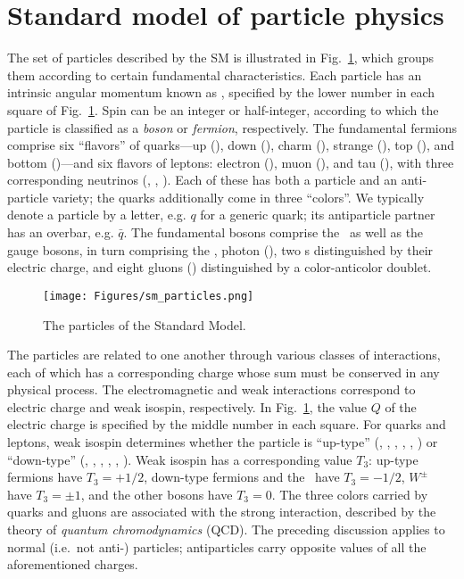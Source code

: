 \section{Standard model of particle physics} \label{sec:introduction_standard_model}
The set of particles described by the SM is illustrated in Fig.~\ref{fig:sm_particles}, which
groups them according to certain fundamental characteristics.
Each particle has an intrinsic angular momentum known as , specified by the lower number in each square of Fig.~\ref{fig:sm_particles}.
Spin can be an integer or half-integer, according to which the particle is classified as a \textit{boson} or \textit{fermion}, respectively.
The fundamental fermions comprise six ``flavors'' of quarks---up (\Pu), down (\Pd), charm (\Pc), strange (\Ps), top (\Pt), and bottom (\Pb)---and six flavors of
leptons: electron (\Pe), muon (\Pmu), and tau (\Ptau), with three corresponding neutrinos (\Pne, \Pnmu, \Pntau).
Each of these has both a particle and an anti-particle variety; the quarks additionally come in three ``colors''.
We typically denote a particle by a letter, e.g. $q$ for a generic quark; its antiparticle partner has an overbar, e.g. $\bar{q}$.
The fundamental bosons comprise the \PH\ as well as the gauge bosons, in turn comprising the \PZ, photon (\Pgamma),
two \PW s distinguished by their electric charge, and eight gluons (\Pg) distinguished by a color-anticolor doublet.

\begin{figure}[hbtp]
  \begin{center}
    \texttt{[image: Figures/sm\_particles.png]}
    \caption{
      The particles of the Standard Model.
    }
    \label{fig:sm_particles}
  \end{center}
\end{figure}

The particles are related to one another through various
classes of interactions, each of which has a corresponding charge whose sum must be conserved in any physical process.
The electromagnetic and weak interactions correspond to electric charge and weak isospin, respectively.
In Fig.~\ref{fig:sm_particles}, the value $Q$ of the electric charge is specified by the middle number in each square.
For quarks and leptons, weak isospin determines whether the particle is ``up-type''
(\Pu, \Pd, \Pt, \Pne, \Pnmu, \Pntau) or ``down-type'' (\Pd, \Ps, \Pb, \Pe, \Pmu, \Ptau).
Weak isospin has a corresponding value $T_{3}$: up-type fermions have $T_{3} = \mathrm{+}1/2$, down-type fermions and the \PH\ have
$T_{3} = \mathrm{-}1/2$, $W^\pm$ have $T_{3} = \pm1$, and the other bosons have $T_{3} = 0$.
The three colors carried by quarks and gluons are associated with the strong interaction, described by the theory of \textit{quantum
chromodynamics} (QCD). The preceding discussion applies to normal (i.e.\ not anti-) particles; antiparticles carry opposite values of all the
aforementioned charges.

